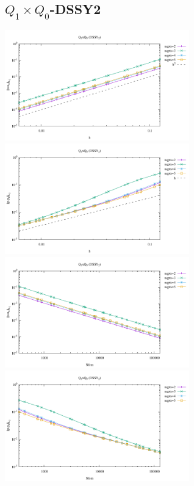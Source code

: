 \subsection*{$Q_1\times Q_0$-DSSY2}
\begin{center}
\includegraphics[width=8cm]{python_codes/fieldstone_120/results/DSSY2Q0-velocity-h.pdf}
\includegraphics[width=8cm]{python_codes/fieldstone_120/results/DSSY2Q0-pressure-h.pdf}
\includegraphics[width=8cm]{python_codes/fieldstone_120/results/DSSY2Q0-velocity-Nfem.pdf}
\includegraphics[width=8cm]{python_codes/fieldstone_120/results/DSSY2Q0-pressure-Nfem.pdf}
\end{center}

